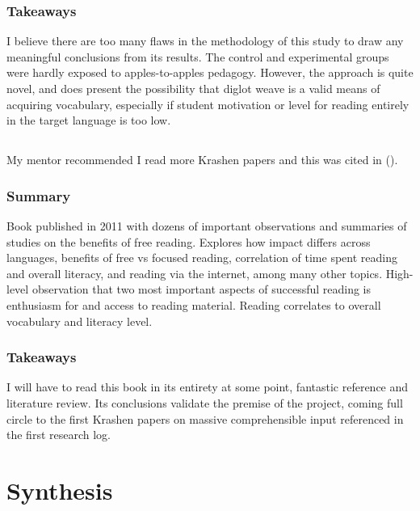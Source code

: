\documentclass[
	letterpaper, %
]{jdf}
\newcommand{\pcite}[1]{(\cite{#1})}
\begin{document}
\subsubsection{Takeaways}
I believe there are too many flaws in the methodology of this study to draw any meaningful conclusions from its results. The control and experimental groups were hardly exposed to apples-to-apples pedagogy. However, the approach is quite novel, and does present the possibility that diglot weave is a valid means of acquiring vocabulary, especially if student motivation or level for reading entirely in the target language is too low.

\subsection{}
My mentor recommended I read more Krashen papers and this was cited in \pcite{llm_augmented_exercise_retrieval}.

\subsubsection{Summary}
Book published in 2011 with dozens of important observations and summaries of studies on the benefits of free reading. Explores how impact differs across languages, benefits of free vs focused reading, correlation of time spent reading and overall literacy, and reading via the internet, among many other topics. High-level observation that two most important aspects of successful reading is enthusiasm for and access to reading material. Reading correlates to overall vocabulary and literacy level.

\subsubsection{Takeaways}
I will have to read this book in its entirety at some point, fantastic reference and literature review. Its conclusions validate the premise of the project, coming full circle to the first Krashen papers on massive comprehensible input referenced in the first research log.

\section{Synthesis}
\end{document}
